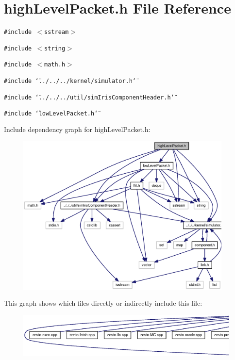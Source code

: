 \section{highLevelPacket.h File Reference}
\label{highLevelPacket_8h}
{\tt \#include $<$sstream$>$}\par
{\tt \#include $<$string$>$}\par
{\tt \#include $<$math.h$>$}\par
{\tt \#include \char`\"{}../../../kernel/simulator.h\char`\"{}}\par
{\tt \#include \char`\"{}../../../util/simIrisComponentHeader.h\char`\"{}}\par
{\tt \#include \char`\"{}lowLevelPacket.h\char`\"{}}\par


Include dependency graph for highLevelPacket.h:\nopagebreak
\begin{figure}[H]
\begin{center}
\leavevmode
\includegraphics[width=306pt]{highLevelPacket_8h__incl}
\end{center}
\end{figure}


This graph shows which files directly or indirectly include this file:\nopagebreak
\begin{figure}[H]
\begin{center}
\leavevmode
\includegraphics[width=420pt]{highLevelPacket_8h__dep__incl}
\end{center}
\end{figure}
